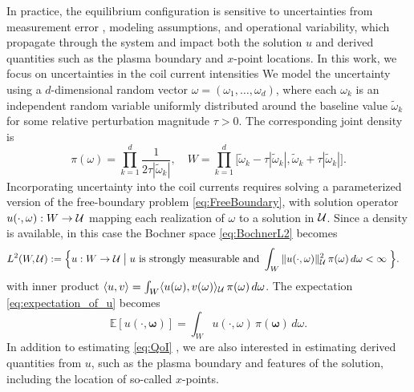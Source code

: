 In practice, the equilibrium configuration is sensitive to uncertainties from measurement error 
,
modeling assumptions, and operational variability, which propagate through the system and impact both the solution $u$ and 
derived quantities such as the plasma boundary and $x$-point locations. In this work, we focus on uncertainties in the coil current intensities
We model the uncertainty using a $d$-dimensional random vector $\omega= (\omega_1, \ldots, \omega_d)$, 
where each $\omega_k$ is an independent random variable uniformly distributed around the baseline value 
$\widetilde{\omega}_k$ for some relative perturbation magnitude $\tau > 0$. The corresponding joint density is
%
\[
\pi \left(\omega\right)=\prod_{k=1}^{d} \frac{1}{2\tau |\widetilde{\omega}_k|},\quad 
W=\prod_{k=1}^{d}\big[ \widetilde{\omega}_k-\tau  | \widetilde{\omega}_k | ,\widetilde{\omega}_k+\tau  | \widetilde{\omega}_k  | \big].
\]
%
Incorporating uncertainty into the coil currents requires solving a parameterized version of the free-boundary problem \eqref{eq:FreeBoundary}, 
with solution operator $u(\cdot,\omega) : W \to \mathcal{U}$ mapping each realization of $\omega$ to a solution in $\mathcal{U}$. 
Since a density is available, in this case the Bochner space  \eqref{eq:BochnerL2} becomes
\begin{align*}     
  L^2(W, \mathcal{U}) := \Big\{ u: W \rightarrow \mathcal{U} \;\big|\; & 
                                    u \mbox{ is strongly measurable and } 
                                       \int_W \| u(\cdot,\omega) \|_{\mathcal{U}}^2 \, \pi(\omega) \, d\omega < \infty \; \Big\}.
\end{align*}
with inner product $ \langle u, v \rangle =  \int_W  \langle  u(\omega) , v(\omega)  \rangle_{\mathcal{U}} \, \pi(\omega) \, d\omega$.
The expectation   \eqref{eq:expectation_of_u} becomes
 \begin{equation}  \label{eq:QoI}
      \mathbb{E}\left[u(\cdot,\boldsymbol \omega)\right]=\int_W u(\cdot,\omega) \, \pi(\boldsymbol\omega) \,d\omega.
 \end{equation}
 In addition to estimating  \eqref{eq:QoI} , we are also interested in estimating derived quantities from $u$, such as the plasma boundary 
 and features of the solution, including the location of so-called  $x$-points.



